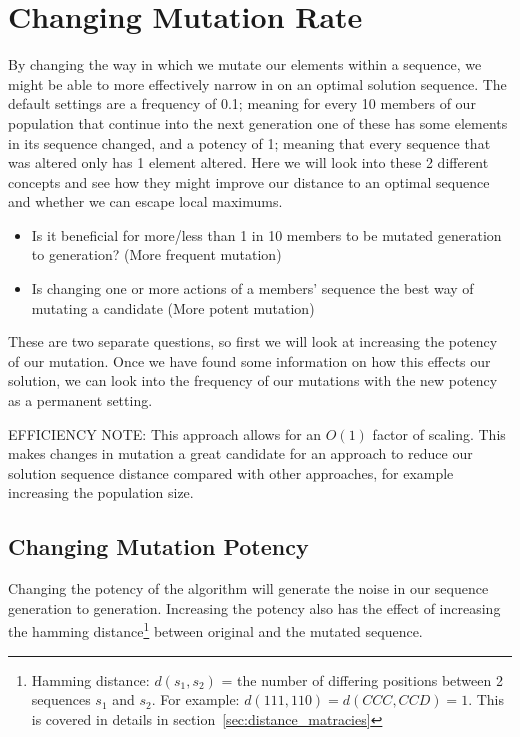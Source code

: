 \section{Changing Mutation Rate}\label{sec:changeingmutationrate}
By changing the way in which we mutate our elements within a sequence, we might be able to more effectively narrow in on an optimal solution sequence.
The default settings are a frequency of 0.1; meaning for every 10 members of our population that continue into the next generation one of these has some elements in its sequence changed, and a potency of 1;
meaning that every sequence that was altered only has 1 element altered.
Here we will look into these 2 different concepts and see how they might improve our distance to an optimal sequence and whether we can escape local maximums.
\begin{itemize}
    \item Is it beneficial for more/less than 1 in 10 members to be mutated generation to generation? (More frequent mutation)
    \item Is changing one or more actions of a members' sequence the best way of mutating a candidate (More potent mutation)
\end{itemize}

These are two separate questions, so first we will look at increasing the potency of our mutation.
Once we have found some information on how this effects our solution, we can look into the frequency of our mutations with the new potency as a permanent setting.

EFFICIENCY NOTE\@: This approach allows for an \(O(1)\) factor of scaling.
This makes changes in mutation a great candidate for an approach to reduce our solution sequence distance compared with other approaches, for example increasing the population size.

\subsection{Changing Mutation Potency}\label{subsec:changingMutationPotency}
Changing the potency of the algorithm will generate the noise in our sequence generation to generation.
Increasing the potency also has the effect of increasing the hamming distance\footnote{Hamming distance: \(d(s_1,s_2)\) = the number of differing positions between 2 sequences \(s_1\) and \(s_2\).
For example: \(d(111,110) = d(CCC,CCD) = 1 \). This is covered in details in section~\ref{sec:distance_matracies}} between original and the mutated sequence.
 
